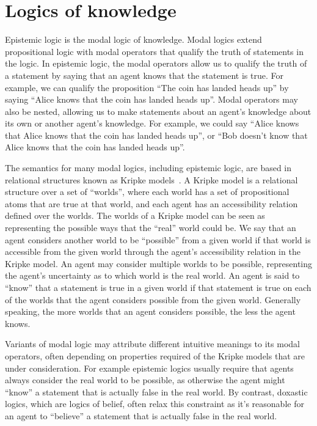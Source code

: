 \section{Logics of knowledge}

Epistemic logic is the modal logic of knowledge.
Modal logics extend propositional logic with modal operators that qualify the truth of statements in the logic.
In epistemic logic, the modal operators allow us to qualify the truth of a statement by saying that an agent knows that the statement is true.
For example, we can qualify the proposition ``The coin has landed heads up'' by saying ``Alice knows that the coin has landed heads up''.
Modal operators may also be nested, allowing us to make statements about an agent's knowledge about its own or another agent's knowledge.
For example, we could say ``Alice knows that Alice knows that the coin has landed heads up'', or ``Bob doesn't know that Alice knows that the coin has landed heads up''.

The semantics for many modal logics, including epistemic logic, are based in relational structures known as Kripke models~\cite{kripke:1963,blackburn:2001}.
A Kripke model is a relational structure over a set of ``worlds'', where each world has a set of propositional atoms that are true at that world, and each agent has an accessibility relation defined over the worlds.
The worlds of a Kripke model can be seen as representing the possible ways that the ``real'' world could be.
We say that an agent considers another world to be ``possible'' from a given world if that world is accessible from the given world through the agent's accessibility relation in the Kripke model.
An agent may consider multiple worlds to be possible, representing the agent's uncertainty as to which world is the real world.
An agent is said to ``know'' that a statement is true in a given world if that statement is true on each of the worlds that the agent considers possible from the given world.
Generally speaking, the more worlds that an agent considers possible, the less the agent knows.

Variants of modal logic may attribute different intuitive meanings to its modal operators, often depending on properties required of the Kripke models that are under consideration.
For example epistemic logics usually require that agents always consider the real world to be possible, as otherwise the agent might ``know'' a statement that is actually false in the real world.
By contrast, doxastic logics, which are logics of belief, often relax this constraint as it's reasonable for an agent to ``believe'' a statement that is actually false in the real world.

